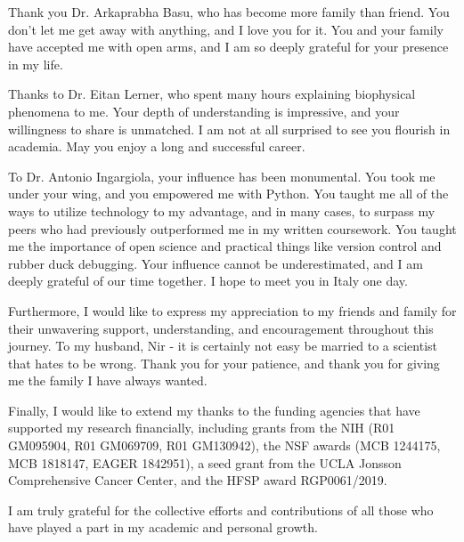 Thank you Dr. Arkaprabha Basu, who has become more family than friend. 
You don't let me get away with anything, and I love you for it.
You and your family have accepted me with open arms, and I am so deeply grateful for your presence in my life.

Thanks to Dr. Eitan Lerner, who spent many hours explaining biophysical phenomena to me. 
Your depth of understanding is impressive, and your willingness to share is unmatched. 
I am not at all surprised to see you flourish in academia.
May you enjoy a long and successful career. 

To Dr. Antonio Ingargiola, your influence has been monumental.
You took me under your wing, and you empowered me with Python.
You taught me all of the ways to utilize technology to my advantage, and in many cases, to surpass my peers who had previously outperformed me in my written coursework. 
You taught me the importance of open science and practical things like version control and rubber duck debugging.
Your influence cannot be underestimated, and I am deeply grateful of our time together. 
I hope to meet you in Italy one day. 

Furthermore, I would like to express my appreciation to my friends and family for their unwavering support, understanding, and encouragement throughout this journey. 
To my husband, Nir - 
it is certainly not easy be married to a scientist that hates to be wrong.
Thank you for your patience, and thank you for giving me the family I have always wanted. 

Finally, I would like to extend my thanks to the funding agencies that have supported my research financially, including grants from the NIH (R01 GM095904, R01 GM069709, R01 GM130942), the NSF awards (MCB 1244175, MCB 1818147, EAGER 1842951), a seed grant from the UCLA Jonsson Comprehensive Cancer Center, and the HFSP award RGP0061/2019. 

\vspace{3em}

\noindent{}I am truly grateful for the collective efforts and contributions of all those who have played a part in my academic and personal growth.

\vspace*{\fill}